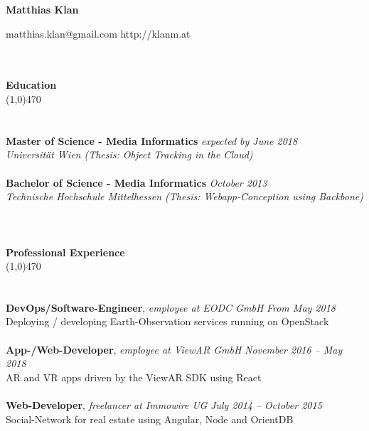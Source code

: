\documentclass[10pt]{article} %
\begin{document}
\centerline{{\LARGE \bf Matthias Klan}}
\centerline{matthias.klan@gmail.com \raisebox{0.25ex}{\tiny$\bullet$} http://klanm.at}

\noindent %
\\\\
{\Large \bf Education}\\
\line(1,0){470}\\
\\\\
\noindent
{\bf Master of Science - Media Informatics} \hfill \textit{expected by June 2018} \\ 
\textit{Universität Wien (Thesis: Object Tracking in the Cloud)}\\\\
\noindent
{\bf Bachelor of Science - Media Informatics} \hfill \textit{October 2013} \\
\textit{Technische Hochschule Mittelhessen (Thesis: Webapp-Conception using Backbone)}\\
\\
\noindent %
\\\\
{\Large \bf Professional Experience}\\
\line(1,0){470}\\
\\\\
\noindent
{\bf DevOps/Software-Engineer}, \textit{employee at EODC GmbH}  \hfill \textit{ From May 2018 } \\ 
Deploying / developing Earth-Observation services running on OpenStack\\\\
\noindent
\noindent
{\bf App-/Web-Developer}, \textit{employee at ViewAR GmbH}  \hfill \textit{ November 2016 -- May 2018 } \\ 
AR and VR apps driven by the ViewAR SDK using React\\\\
\noindent
{\bf Web-Developer}, \textit{freelancer at Immowire UG}  \hfill \textit{ July 2014 -- October 2015 } \\ 
Social-Network for real estate using Angular, Node and OrientDB\\\\
\end{document}
